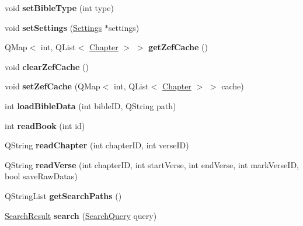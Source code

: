 \begin{CompactItemize}
\item 
\hypertarget{classBible_a0b10f677493b0777674be2651f2473e}{
void \textbf{setBibleType} (int type)}
\label{classBible_a0b10f677493b0777674be2651f2473e}

\item 
\hypertarget{classBible_bbc3f50a8babc5b981463f43a526623f}{
void \textbf{setSettings} (\hyperlink{classSettings}{Settings} $\ast$settings)}
\label{classBible_bbc3f50a8babc5b981463f43a526623f}

\item 
\hypertarget{classBible_8f30a6305d224eab73f436056938a256}{
QMap$<$ int, QList$<$ \hyperlink{structChapter}{Chapter} $>$ $>$ \textbf{getZefCache} ()}
\label{classBible_8f30a6305d224eab73f436056938a256}

\item 
\hypertarget{classBible_3a9612c55d834da8d41249fab191a425}{
void \textbf{clearZefCache} ()}
\label{classBible_3a9612c55d834da8d41249fab191a425}

\item 
\hypertarget{classBible_6c4455772400d25447069fd3e0ea7069}{
void \textbf{setZefCache} (QMap$<$ int, QList$<$ \hyperlink{structChapter}{Chapter} $>$ $>$ cache)}
\label{classBible_6c4455772400d25447069fd3e0ea7069}

\item 
\hypertarget{classBible_d02ec57b5250dc380b0ef07d26fe2300}{
int \textbf{loadBibleData} (int bibleID, QString path)}
\label{classBible_d02ec57b5250dc380b0ef07d26fe2300}

\item 
\hypertarget{classBible_0057dd2ba35fe377624da860a6959cd9}{
int \textbf{readBook} (int id)}
\label{classBible_0057dd2ba35fe377624da860a6959cd9}

\item 
\hypertarget{classBible_42e0e107fa2b5966bfa90f60a0fdc3cb}{
QString \textbf{readChapter} (int chapterID, int verseID)}
\label{classBible_42e0e107fa2b5966bfa90f60a0fdc3cb}

\item 
\hypertarget{classBible_515418999329333e8a6a821fc88d006f}{
QString \textbf{readVerse} (int chapterID, int startVerse, int endVerse, int markVerseID, bool saveRawDatas)}
\label{classBible_515418999329333e8a6a821fc88d006f}

\item 
\hypertarget{classBible_21a6808e0663d2f99604e137184b2b4d}{
QStringList \textbf{getSearchPaths} ()}
\label{classBible_21a6808e0663d2f99604e137184b2b4d}

\item 
\hypertarget{classBible_33103e25381494250b9a351572bb4e8e}{
\hyperlink{classSearchResult}{SearchResult} \textbf{search} (\hyperlink{classSearchQuery}{SearchQuery} query)}
\label{classBible_33103e25381494250b9a351572bb4e8e}

\end{CompactItemize}
